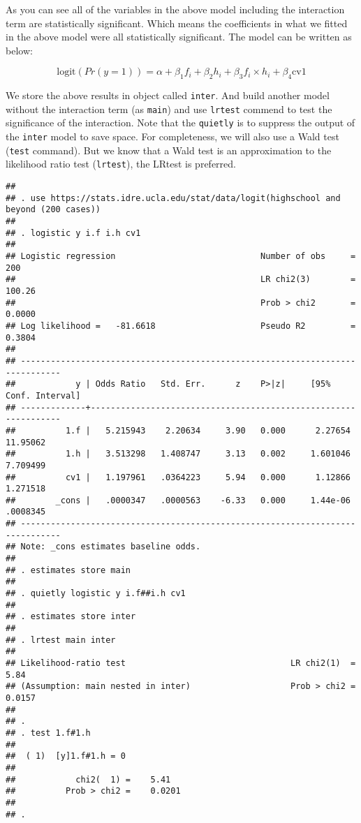 \documentclass[
]{article}
\begin{document}
As you can see all of the variables in the above model including the
interaction term are statistically significant. Which means the
coefficients in what we fitted in the above model were all statistically
significant. The model can be written as below:

\[
\text{logit}(Pr(y = 1)) = \alpha + \beta_1 f_{i} + \beta_2 h_{i} + \beta_3 f_i\times h_i + \beta_4 \text{cv1}
\]

We store the above results in object called \texttt{inter}. And build
another model without the interaction term (as \texttt{main}) and use
\texttt{lrtest} commend to test the significance of the interaction.
Note that the \texttt{quietly} is to suppress the output of the
\texttt{inter} model to save space. For completeness, we will also use a
Wald test (\texttt{test} command). But we know that a Wald test is an
approximation to the likelihood ratio test (\texttt{lrtest}), the LRtest
is preferred.

\begin{verbatim}
## 
## . use https://stats.idre.ucla.edu/stat/data/logit(highschool and beyond (200 cases))
## 
## . logistic y i.f i.h cv1
## 
## Logistic regression                             Number of obs     =        200
##                                                 LR chi2(3)        =     100.26
##                                                 Prob > chi2       =     0.0000
## Log likelihood =   -81.6618                     Pseudo R2         =     0.3804
## 
## ------------------------------------------------------------------------------
##            y | Odds Ratio   Std. Err.      z    P>|z|     [95% Conf. Interval]
## -------------+----------------------------------------------------------------
##          1.f |   5.215943    2.20634     3.90   0.000      2.27654    11.95062
##          1.h |   3.513298   1.408747     3.13   0.002     1.601046    7.709499
##          cv1 |   1.197961   .0364223     5.94   0.000      1.12866    1.271518
##        _cons |   .0000347   .0000563    -6.33   0.000     1.44e-06    .0008345
## ------------------------------------------------------------------------------
## Note: _cons estimates baseline odds.
## 
## . estimates store main
## 
## . quietly logistic y i.f##i.h cv1
## 
## . estimates store inter
## 
## . lrtest main inter 
## 
## Likelihood-ratio test                                 LR chi2(1)  =      5.84
## (Assumption: main nested in inter)                    Prob > chi2 =    0.0157
## 
## . 
## . test 1.f#1.h 
## 
##  ( 1)  [y]1.f#1.h = 0
## 
##            chi2(  1) =    5.41
##          Prob > chi2 =    0.0201
## 
## .
\end{verbatim}
\end{document}
